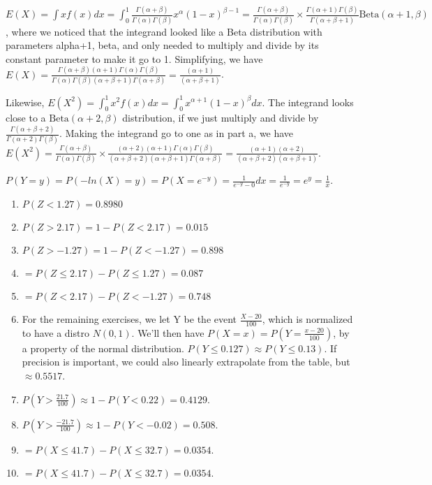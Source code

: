 \documentclass{article}
\begin{document}
\begin{prob}
	$E(X)= \int xf(x)dx= \int_{0}^{1}\frac{\Gamma(\alpha+\beta)}{\Gamma(\alpha)\Gamma(\beta)}x^{\alpha}(1-x)^{\beta -1}=\frac{\Gamma(\alpha+\beta)}{\Gamma(\alpha)\Gamma(\beta)}\times\frac{\Gamma(\alpha+1)\Gamma(\beta)}{\Gamma(\alpha+\beta+1)}\text{Beta}(\alpha+1, \beta)$, where we noticed that the integrand looked like a Beta distribution with parameters alpha+1, beta, and only needed to multiply and divide by its constant parameter to make it go to 1.
	Simplifying, we have $E(X)=\frac{\Gamma(\alpha+\beta)(\alpha+1)\Gamma(\alpha)\Gamma(\beta)}{\Gamma(\alpha)\Gamma(\beta)(\alpha+\beta+1)\Gamma(\alpha+\beta)}=\frac{(\alpha+1)}{(\alpha+\beta+1)}$.

	Likewise, $E(X^2)=\int^{1}_{0}x^2f(x)dx= \int^{1}_{0}x^{\alpha+1}(1-x)^{\beta}dx$. The integrand looks close to a $\text{Beta}(\alpha+2, \beta)$ distribution, if we just multiply and divide by $\frac{\Gamma(\alpha+\beta+2)}{\Gamma(\alpha+2)\Gamma(\beta)}$.
	Making the integrand go to one as in part a, we have $E(X^2)=\frac{\Gamma(\alpha+\beta)}{\Gamma(\alpha)\Gamma(\beta)}\times\frac{(\alpha+2)(\alpha+1)\Gamma(\alpha)\Gamma(\beta)}{(\alpha+\beta+2)(\alpha+\beta+1)\Gamma(\alpha+\beta)}=\frac{(\alpha+1)(\alpha+2)}{(\alpha+\beta+2)(\alpha+\beta+1)}$.
\end{prob}
\begin{prob}
	$P(Y=y)=P(-ln(X)=y)=P(X=e^{-y})= \frac{1}{e^{-y}-0}dx=\frac{1}{e^{-y}}=e^y=\frac{1}{x}$.
\end{prob}
\begin{prob}
	\begin{enumerate}
		\item $P(Z<1.27)=0.8980$ 
		\item $P(Z>2.17)= 1-P(Z<2.17)= 0.015$
		\item $P(Z>-1.27)=1-P(Z<-1.27)=0.898$ 
		\item $=P(Z \leq 2.17)- P(Z \leq 1.27)= 0.087$
		\item $=P(Z < 2.17)-P(Z<-1.27)= 0.748$
	\item For the remaining exercises, we let Y be the event $\frac{X-20}{100}$, which is normalized to have a distro $N(0,1)$. We'll then have $P(X=x)=P(Y=\frac{x-20}{100})$, by a property of the normal distribution.
		$P(Y \leq 0.127)\approx P(Y \leq 0.13)$. If precision is important, we could also linearly extrapolate from the table, but $\approx0.5517$.
	\item $P(Y >\frac{21.7}{100})\approx1-P(Y<0.22)=0.4129$.
	\item $P(Y>\frac{-21.7}{100})\approx1-P(Y<-0.02)=0.508$.
	\item $=P(X\leq 41.7)-P(X \leq 32.7)=0.0354$.
	\item $=P(X \leq 41.7)-P(X \leq 32.7)= 0.0354$.
	\end{enumerate}
\end{prob}
\end{document}
